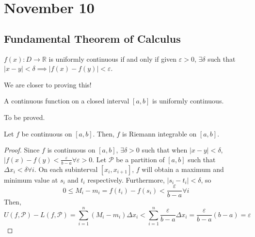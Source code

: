 \section{November 10}

\subsection{Fundamental Theorem of Calculus}
\begin{definition}
    $f(x): D \to \mathbb{R}$ is uniformly continuous if and only if given $\varepsilon > 0$, $\exists \delta$ such that $|x - y| < \delta \implies |f(x) - f(y)| < \varepsilon$.
\end{definition}
\begin{remark}
    We are closer to proving this!
\end{remark}

\begin{theorem}
    A continuous function on a closed interval $[a, b]$ is uniformly continuous.
\end{theorem}
\begin{remark}
    To be proved.
\end{remark}

\begin{theorem}
    Let $f$ be continuous on $[a, b]$. Then, $f$ is Riemann integrable on $[a, b]$.
\end{theorem}
\begin{proof}
    Since $f$ is continuous on $[a, b]$, $\exists \delta > 0$ such that when $|x - y| < \delta$, $|f(x) - f(y) < \frac{\varepsilon}{b - a} \forall \varepsilon > 0$. Let $\mathcal{P}$ be a partition of $[a, b]$ such that $\Delta x_i < \delta \forall i$. On each subinterval $[x_i, x_{i + 1}]$, $f$ will obtain a maximum and minimum value at $s_i$ and $t_i$ respectively. Furthermore, $|s_i - t_i| < \delta$, so $$0 \leq M_i - m_i = f(t_i) - f(s_i) < \frac{\varepsilon}{b - a} \forall i$$ Then, $$U(f, \mathcal{P}) - L(f, \mathcal{P}) = \sum_{i = 1}^n (M_i - m_i) \Delta x_i < \sum_{i = 1}^n \frac{\varepsilon}{b - a} \Delta x_i = \frac{\varepsilon}{b - a} (b - a) = \varepsilon$$
\end{proof}


